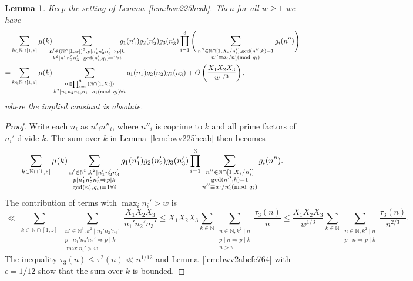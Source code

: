 \documentclass[a4paper,12pt,reqno]{amsart}
\numberwithin{equation}{section} \numberwithin{figure}{section}
\newcommand\N{\mathbb{N}}
\newcommand{\md}[1]{  \left(\textnormal{mod}\ #1\right)}
\renewcommand{\l}{\left}
\renewcommand{\r}{\right}
\renewcommand{\b}{\mathbf}
\renewcommand{\gcd}{\textrm{gcd}}
\renewcommand{\leq}{\leqslant}
\renewcommand{\geq}{\geqslant}
\renewcommand{\#}{\sharp}
\newtheorem{lemma}{Lemma}
\theoremstyle{definition}
\numberwithin{lemma}{section}
\begin{document}
\begin{lemma}
\label{lem:bwv225hcab676764}
Keep the setting of Lemma~\ref{lem:bwv225hcab}. Then for all $w\geq 1 $ we have \begin{align*}
&\sum_{\substack{ k\in \N \cap [1,z]  } } \mu(k)\hspace{-0,2cm}
 \sum_{\substack{ \b n' \in (\N\cap[1,w])^3, p\mid n_1'n_2'n_3' \Rightarrow p\mid k \\
k^2\mid n_1'n_2'n_3' ,\ 
\gcd(n_i',q_i)=1 \forall i } }\hspace{-0,3cm}
g_1(n_1')g_2(n_2')g_3(n_3') 
\prod_{i=1}^3 \Bigg(
\sum_{\substack{  n'' \in \N \cap [1, X_i/n'_i],  \gcd(n'',k)=1
  \\   n'' \equiv a_i/n'_i \md {q_i} }}
g_i(n'') \Bigg)
\\ 
=&\sum_{\substack{ k\in \N \cap [1,z]  } } \mu(k)
\sum_{\substack{ \b n \in \prod_{i=1}^3 (\N \cap [1,X_i] )  \\
k^2\mid n_1n_2n_3  , n_i\equiv a_i \md {q_i} \forall i  } }g_1(n_1)g_2(n_2)g_3(n_3) 
+O\l(\frac{X_1X_2X_3}{w^{1/3} } \r)
,
\end{align*} where the implied constant     is absolute.
      \end{lemma}\begin{proof}
Write each $n_i$ as $n'_in''_i$, where $n''_i$ is coprime to $k$ and all prime factors of $n_i'$ divide $k$. The sum over $k $ in 
Lemma~\ref{lem:bwv225hcab}
then becomes 
  \[\sum_{\substack{ k\in \N \cap [1,z]  } } \mu(k)
 \sum_{\substack{ \b n' \in \N^3, k^2\mid n_1'n_2'n_3'   \\  p\mid n_1'n_2'n_3' \Rightarrow p\mid k\\
\gcd(n_i',q_i)=1 \forall i } }
g_1(n_1')g_2(n_2')g_3(n_3') 
\prod_{i=1}^3 \sum_{\substack{  n'' \in \N \cap [1, X_i/n'_i]   \\ \gcd(n'',k)=1  \\   n'' \equiv a_i/n'_i \md {q_i} }}g_i(n'') 
.\]  The contribution of terms with $\max_i n_i'>w$ is 
\[
\ll \sum_{\substack{ k\in \N \cap [1,z]  } }  
 \sum_{\substack{ \b n' \in \N^3, k^2\mid n_1'n_2'n_3'   \\  p\mid n_1'n_2'n_3' \Rightarrow p\mid k\\
\max n_i'>w} }  \frac{X_1X_2X_3}{n_1'n_2'n_3'}
\leq  X_1X_2X_3 \sum_{k\in \N }   \sum_{\substack{ n \in \N , k^2\mid n   \\  p\mid n \Rightarrow p\mid k\\ n>w} } \frac{\tau_3(n) }{n} 
\leq  \frac{X_1X_2X_3}{w^{1/3} }
 \sum_{k\in \N }   \sum_{\substack{ n \in \N , k^2\mid n   \\  p\mid n \Rightarrow p\mid k } } \frac{\tau_3(n) }{n^{2/3}} 
 .\] The inequality  $\tau_3(n) \leq \tau^2(n) \ll n^{1/12 }$ and   
Lemma~\ref{lem:bwv2abcfe764} with $\epsilon=1/12$ show  that the sum over $k  $ is bounded.  \end{proof}
\end{document}
